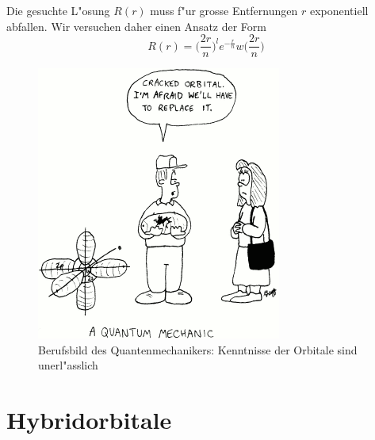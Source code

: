 Die gesuchte L"osung $R(r)$ muss f"ur grosse Entfernungen $r$ exponentiell
abfallen.
Wir versuchen daher einen Ansatz der Form
\[
R(r)=\biggl(\frac{2r}{n}\biggr)^le^{-\frac{r}{n}}w\biggl(\frac{2r}{n}\biggr)
\]


\begin{figure}
\centering
\includegraphics[width=0.4\hsize]{images/crackedorbital.png}
\caption{Berufsbild des Quantenmechanikers: Kenntnisse der Orbitale
sind unerl"asslich\label{skript:crackedorbital}}
\end{figure}

\section{Hybridorbitale}

